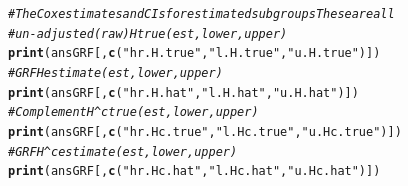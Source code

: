 \documentclass[smallextended]{svjour3}
\makeatletter
\newcommand{\hlstr}[1]{\textcolor[rgb]{0.192,0.494,0.8}{#1}}%
\newcommand{\hlcom}[1]{\textcolor[rgb]{0.678,0.584,0.686}{\textit{#1}}}%
\newcommand{\hlstd}[1]{\textcolor[rgb]{0.345,0.345,0.345}{#1}}%
\newcommand{\hlkwd}[1]{\textcolor[rgb]{0.737,0.353,0.396}{\textbf{#1}}}%
\newenvironment{kframe}{%
 \def\at@end@of@kframe{}%
 \ifinner\ifhmode%
  \def\at@end@of@kframe{\end{minipage}}%
  \begin{minipage}{\columnwidth}%
 \fi\fi%
 \def\FrameCommand##1{\hskip\@totalleftmargin \hskip-\fboxsep
 \colorbox{shadecolor}{##1}\hskip-\fboxsep
     \hskip-\linewidth \hskip-\@totalleftmargin \hskip\columnwidth}%
 \MakeFramed {\advance\hsize-\width
   \@totalleftmargin\z@ \linewidth\hsize
   \@setminipage}}%
 {\par\unskip\endMakeFramed%
 \at@end@of@kframe}
\newenvironment{knitrout}{}{} %
\makeatother
\begin{document}
\begin{knitrout}
\begin{kframe}
\begin{alltt}
    \hlcom{# The Cox estimates and CIs for estimated subgroups These are all}
    \hlcom{# un-adjusted (raw) H true (est,lower,upper)}
    \hlkwd{print}\hlstd{(ansGRF[,} \hlkwd{c}\hlstd{(}\hlstr{"hr.H.true"}\hlstd{,} \hlstr{"l.H.true"}\hlstd{,} \hlstr{"u.H.true"}\hlstd{)])}
    \hlcom{# GRF H estimate (est,lower,upper)}
    \hlkwd{print}\hlstd{(ansGRF[,} \hlkwd{c}\hlstd{(}\hlstr{"hr.H.hat"}\hlstd{,} \hlstr{"l.H.hat"}\hlstd{,} \hlstr{"u.H.hat"}\hlstd{)])}
    \hlcom{# Complement H^c true (est,lower,upper)}
    \hlkwd{print}\hlstd{(ansGRF[,} \hlkwd{c}\hlstd{(}\hlstr{"hr.Hc.true"}\hlstd{,} \hlstr{"l.Hc.true"}\hlstd{,} \hlstr{"u.Hc.true"}\hlstd{)])}
    \hlcom{# GRF H^c estimate (est,lower,upper)}
    \hlkwd{print}\hlstd{(ansGRF[,} \hlkwd{c}\hlstd{(}\hlstr{"hr.Hc.hat"}\hlstd{,} \hlstr{"l.Hc.hat"}\hlstd{,} \hlstr{"u.Hc.hat"}\hlstd{)])}


\end{alltt}
\end{kframe}
\end{knitrout}
\end{document}
